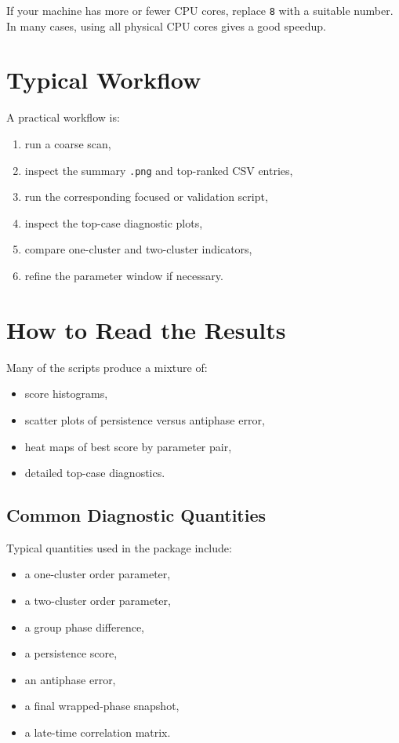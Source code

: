 \documentclass[11pt,a4paper]{article}
\begin{document}
\begin{infobox}
If your machine has more or fewer CPU cores, replace \texttt{8} with a suitable
number. In many cases, using all physical CPU cores gives a good speedup.
\end{infobox}

\section{Typical Workflow}
A practical workflow is:
\begin{enumerate}[leftmargin=1.5em]
    \item run a coarse scan,
    \item inspect the summary \texttt{.png} and top-ranked CSV entries,
    \item run the corresponding focused or validation script,
    \item inspect the top-case diagnostic plots,
    \item compare one-cluster and two-cluster indicators,
    \item refine the parameter window if necessary.
\end{enumerate}

\section{How to Read the Results}
Many of the scripts produce a mixture of:
\begin{itemize}[leftmargin=1.5em]
    \item score histograms,
    \item scatter plots of persistence versus antiphase error,
    \item heat maps of best score by parameter pair,
    \item detailed top-case diagnostics.
\end{itemize}

\subsection{Common Diagnostic Quantities}
Typical quantities used in the package include:
\begin{itemize}[leftmargin=1.5em]
    \item a one-cluster order parameter,
    \item a two-cluster order parameter,
    \item a group phase difference,
    \item a persistence score,
    \item an antiphase error,
    \item a final wrapped-phase snapshot,
    \item a late-time correlation matrix.
\end{itemize}
\end{document}
